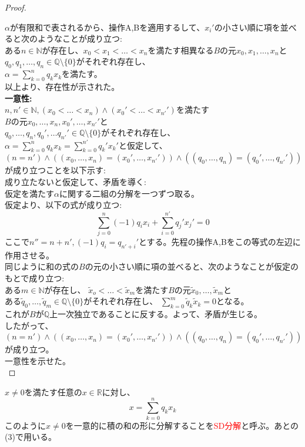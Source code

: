 \documentclass{jreport}
\begin{document}
\begin{proof}
\begin{framed}
	\end{framed}
	$\alpha$が有限和で表されるから、操作A,Bを適用するして、$x_i'$の小さい順に項を並べると次のようなことが成り立つ:\\
	ある$n \in \mathbb{N}$が存在し、$x_0<x_1<\ldots<x_n$を満たす相異なる$B$の元$x_0,x_1,\ldots ,x_n$と$q_0,q_1,\ldots,q_n \in \mathbb{Q}\setminus \{0\}$がそれぞれ存在し、\\
	$\alpha = \sum\limits_{k=0}^n q_k x_k$を満たす。\\
	以上より、存在性が示された。\\
	\textbf{一意性:}\\
	$n,n' \in \mathbb{N},(x_0<\ldots<x_n)\land (x_0'<\ldots<x_{n'}')$を満たす\\
	$B$の元$x_0,\ldots,x_n,x_0',\ldots ,x_{n'}'$と\\
	$q_0,\ldots,q_n, q_0',\ldots q_{n'}' \in \mathbb{Q} \setminus \{0\}$がそれぞれ存在し、\\
	$\alpha =\sum\limits_{k=0}^n q_k x_k =\sum\limits_{k=0}^{n'} q_k' x_k'$と仮定して、\\
	$(n=n') \land ((x_0,\ldots , x_n) =( x_0',\ldots ,x_{n'}')) \land ((q_0, \ldots , q_n) =(q_0',\ldots, q_{n'}'))$が成り立つことを以下示す:\\
	成り立たないと仮定して、矛盾を導く:\\
	仮定を満たす$\alpha$に関する二組の分解を一つずつ取る。\\
	仮定より、以下の式が成り立つ:\\
	$$
	\sum_{j=0}^{n}(-1)q_ix_i + \sum_{i=0}^{n'}q_j'x_j' =0
	$$
	ここで$n'' = n+n',(-1)q_i = q_{n'+i}'$とする。先程の操作A,Bをこの等式の左辺に作用させる。\\
	同じように和の式の$B$の元の小さい順に項の並べると、次のようなことが仮定のもとで成り立つ:\\
	ある$m \in \mathbb{N}$が存在し、
	$\tilde{x}_o<\ldots <\tilde{x}_m$を満たす$B$の元$\tilde{x}_0,\ldots,\tilde{x}_m$と\\
	ある$\tilde{q}_0,\ldots,\tilde{q}_m \in \mathbb{Q}\setminus \{0 \}$がそれぞれ存在し、
	$\sum\limits_{k=0}^m \tilde{q}_k \tilde{x}_k =0$となる。\\
	これが$B$が$\mathbb{Q}$上一次独立であることに反する。よって、矛盾が生じる。\\
	したがって、$(n=n') \land ((x_0,\ldots , x_n) =( x_0',\ldots ,x_{n'}')) \land ((q_0, \ldots , q_n) =(q_0',\ldots, q_{n'}'))$が成り立つ。\\
	一意性を示せた。\\
\end{proof}
	$x\neq 0$を満たす任意の$x \in \mathbb{R}$に対し、\\
	\begin{equation}
		x=\sum_{k=0}^{n}q_kx_k \label{sd}
	\end{equation}
	このように$x \neq 0$を一意的に積の和の形に分解することを\textcolor{red}{SD分解}と呼ぶ。あとの(3)で用いる。
\newpage
\end{document}
